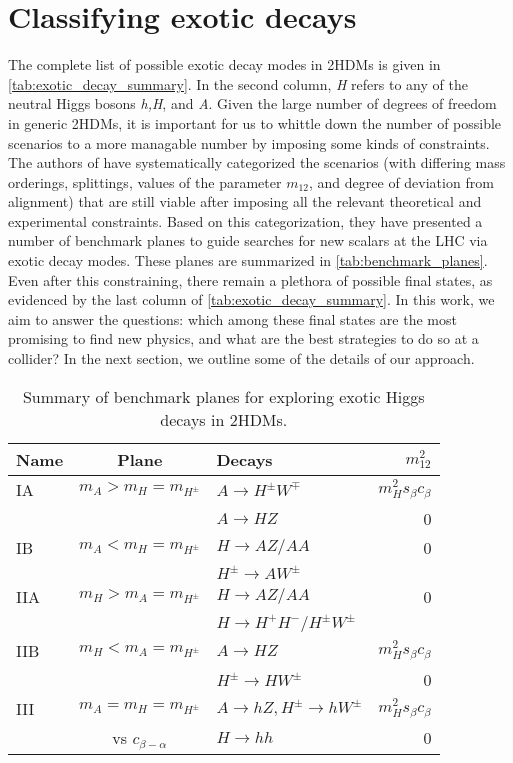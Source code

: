 \section{Classifying exotic decays}

The complete list of possible exotic decay modes in 2HDMs is given in \autoref{tab:exotic_decay_summary}. In the second column, \emph{H} refers to any of the neutral Higgs bosons \emph{h,H}, and \emph{A}. Given the large number of degrees of freedom in generic 2HDMs, it is important for us to whittle down the number of possible scenarios to a more managable number by imposing some kinds of constraints. The authors of \cite{Kling2016} have systematically categorized the scenarios (with differing mass orderings, splittings, values of the parameter $m_{12}$, and degree of deviation from alignment) that are still viable after imposing all the relevant theoretical and experimental constraints. Based on this categorization, they have presented a number of benchmark planes to guide searches for new scalars at the LHC via exotic decay modes. These planes are summarized in \autoref{tab:benchmark_planes}. Even after this constraining, there remain a plethora of possible final states, as evidenced by the last column of \autoref{tab:exotic_decay_summary}. In this work, we aim to answer the questions: which among these final states are the most promising to find new physics, and what are the best strategies to do so at a collider? In the next section, we outline some of the details of our approach.

\begin{table}
  \centering
  \begin{tabular}{lclr}
    \toprule
    Name & Plane & Decays & $m_{12}^2$\\
    \midrule
    IA & $m_A > m_H = m_{H^\pm}$ & $A\rightarrow H^\pm W^\mp$ & $m_H^2s_\beta c_\beta$\\
       &                         & $A\rightarrow HZ$ & 0 \\
       \midrule
    IB & $m_A < m_H = m_{H^\pm}$ & $H\rightarrow AZ/AA$ & 0\\
       &                         & $H^\pm\rightarrow AW^\pm$ &  \\
       \midrule
    IIA & $m_H > m_A = m_{H^\pm}$ & $H\rightarrow AZ/AA$ & 0\\
       &                         & $H\rightarrow H^+H^-/H^\pm W^\pm$&  \\
       \midrule
    IIB & $m_H < m_A = m_{H^\pm}$ & $A\rightarrow HZ$ & $m_H^2s_\beta c_\beta$\\
       &                         & $H^\pm\rightarrow HW^\pm$ & 0 \\
       \midrule
       III & $m_A = m_H = m_{H^\pm}$& $A\rightarrow hZ,H^\pm\rightarrow hW^\pm$ & $m_H^2s_\beta c_\beta$\\
       &     vs $c_{\beta-\alpha}$  & $H\rightarrow hh$ & 0 \\
    \bottomrule
  \end{tabular}
  \caption{Summary of benchmark planes for exploring exotic Higgs decays in 2HDMs.}
  \label{tab:benchmark_planes}
\end{table}

